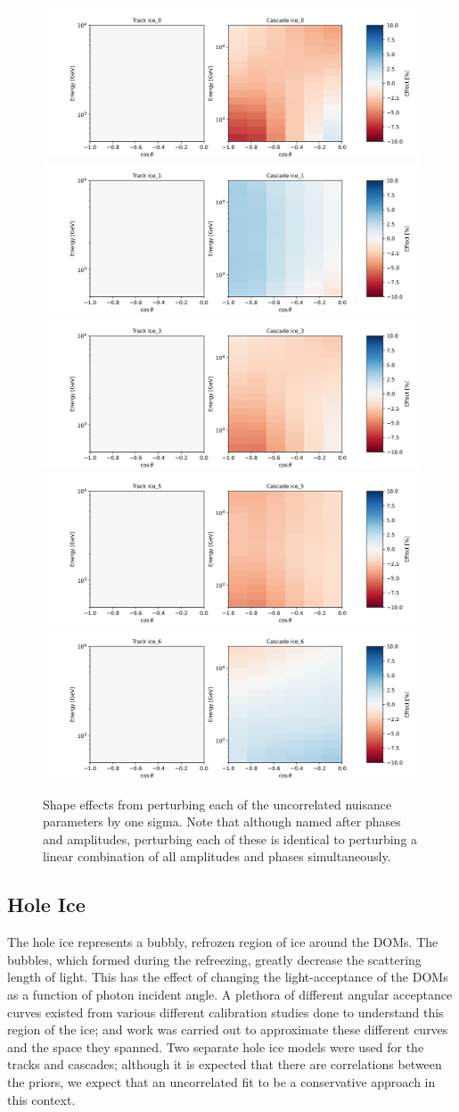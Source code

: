 \documentclass[main.tex]{subfiles}
\begin{document}
\begin{figure}
    \centering
    \includegraphics[width=0.45\linewidth]{figures/systematics/ice_0.png}%
    \includegraphics[width=0.45\linewidth]{figures/systematics/ice_1.png}\\
    \includegraphics[width=0.45\linewidth]{figures/systematics/ice_3.png}%
    \includegraphics[width=0.45\linewidth]{figures/systematics/ice_5.png}\\
    \includegraphics[width=0.45\linewidth]{figures/systematics/ice_6.png}
    \caption{Shape effects from perturbing each of the uncorrelated nuisance parameters by one sigma. Note that although named after phases and amplitudes, perturbing each of these is identical to perturbing a linear combination of all amplitudes and phases simultaneously.}\label{fig:rotata}
\end{figure}


\subsection{Hole Ice}\label{sec:hole_ice}

The hole ice represents a bubbly, refrozen region of ice around the DOMs. 
The bubbles, which formed during the refreezing, greatly decrease the scattering length of light. 
This has the effect of changing the light-acceptance of the DOMs as a function of photon incident angle. 
A plethora of different angular acceptance curves existed from various different calibration studies done to understand this region of the ice; and work was carried out to approximate these different curves and the space they spanned. 
Two separate hole ice models were used for the tracks and cascades; although it is expected that there are correlations between the priors, we expect that an uncorrelated fit to be a conservative approach in this context.  
\end{document}
